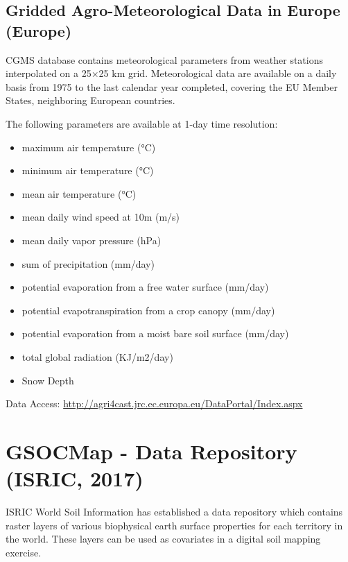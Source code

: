 \documentclass[10pt,b5paper,]{book}
\providecommand{\tightlist}{%
  \setlength{\itemsep}{0pt}\setlength{\parskip}{0pt}}
\theoremstyle{definition}
\theoremstyle{definition}
\theoremstyle{definition}
\theoremstyle{remark}
\begin{document}
\hypertarget{gridded-agro-meteorological-data-in-europe-europe}{%
\subsection{Gridded Agro-Meteorological Data in Europe
(Europe)}\label{gridded-agro-meteorological-data-in-europe-europe}}

CGMS database contains meteorological parameters from weather stations
interpolated on a 25×25 km grid. Meteorological data are available on a
daily basis from 1975 to the last calendar year completed, covering the
EU Member States, neighboring European countries.

The following parameters are available at 1-day time resolution:

\begin{itemize}
\tightlist
\item
  maximum air temperature (°C)
\item
  minimum air temperature (°C)
\item
  mean air temperature (°C)
\item
  mean daily wind speed at 10m (m/s)
\item
  mean daily vapor pressure (hPa)
\item
  sum of precipitation (mm/day)
\item
  potential evaporation from a free water surface (mm/day)
\item
  potential evapotranspiration from a crop canopy (mm/day)
\item
  potential evaporation from a moist bare soil surface (mm/day)
\item
  total global radiation (KJ/m2/day)
\item
  Snow Depth
\end{itemize}

Data Access:
\url{http://agri4cast.jrc.ec.europa.eu/DataPortal/Index.aspx}

\hypertarget{GSOCDataRepo}{%
\section{GSOCMap - Data Repository (ISRIC, 2017)}\label{GSOCDataRepo}}

ISRIC World Soil Information has established a data repository which
contains raster layers of various biophysical earth surface properties
for each territory in the world. These layers can be used as covariates
in a digital soil mapping exercise.
\end{document}
